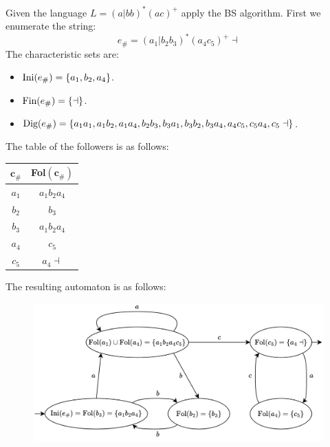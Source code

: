 \begin{example}
    Given the language $L=(a|bb)^{*}(ac)^{+}$ apply the BS algorithm. First we enumerate the string: 
    \[e_{\#}=(a_1|b_2b_3)^{*}(a_4c_5)^{+} \dashv\]
    The characteristic sets are: 
    \begin{itemize}
        \item $\textnormal{Ini}(e_{\#})=\{a_1,b_2,a_4\}$.
        \item $\textnormal{Fin}(e_{\#})=\{\dashv\}$.
        \item $\textnormal{Dig}(e_{\#})=\{a_1a_1,a_1b_2,a_1a_4,b_2b_3,b_3a_1,b_3b_2,b_3a_4,a_4c_5,c_5a_4,c_5\dashv\}$.
    \end{itemize}
    The table of the followers is as follows: 
    \begin{table}[H]
        \centering
        \begin{tabular}{cc}
        \hline
        \textbf{$\boldsymbol{c_{\#}}$} & \textbf{Fol$(\boldsymbol{c_{\#}})$} \\ \hline
        $a_1$                          & $a_1b_2a_4$                         \\
        $b_2$                          & $b_3$                               \\
        $b_3$                          & $a_1b_2a_4$                         \\
        $a_4$                          & $c_5$                               \\
        $c_5$                          & $a_4\dashv$                         \\ \hline
        \end{tabular}
    \end{table}
    The resulting automaton is as follows: 
    \begin{figure}[H]
        \centering
        \includegraphics[width=0.7\linewidth]{images/bs.png}
    \end{figure}
\end{example}

